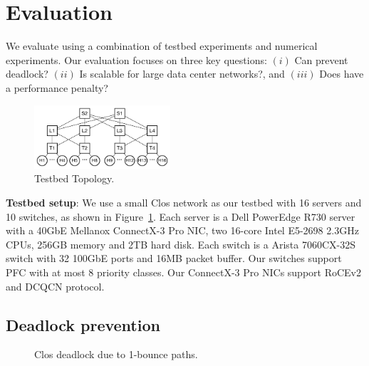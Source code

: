 \section{Evaluation}\label{sec:eval}

We evaluate \sysname{} using a combination of testbed experiments and numerical
experiments. Our evaluation focuses on three key questions: $(i)$ Can \sysname{}
prevent deadlock? $(ii)$ Is \sysname{} scalable for large data center networks?,
and $(iii)$ Does \sysname{} have a performance penalty?

\begin{figure}
	\centering
	\includegraphics[width=0.45\textwidth] {figs/testbed_topo}
	\caption{Testbed Topology.}\label{fig:testbed_topo}
\end{figure}

\textbf{Testbed setup}: We use a small Clos network as our testbed with 16
servers and 10 switches, as shown in Figure~\ref{fig:testbed_topo}. Each server
is a Dell PowerEdge R730 server with a 40GbE Mellanox ConnectX-3 Pro NIC, two
16-core Intel E5-2698 2.3GHz CPUs, 256GB memory and 2TB hard disk. Each switch
is a Arista 7060CX-32S switch with 32 100GbE ports and 16MB packet buffer. Our
switches support PFC with at most 8 priority classes. Our ConnectX-3 Pro NICs
support RoCEv2 and DCQCN protocol.

\subsection{Deadlock prevention}\label{subsec:exp_validation}

\begin{figure}[t]
	\centering
	
	
	\caption{Clos deadlock due to 1-bounce paths.}\label{fig:exp_validation_nonloop}
	
\end{figure}

